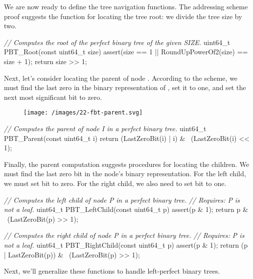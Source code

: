 \documentclass{article}
\begin{document}
We are now ready to define the tree navigation functions.
The addressing scheme proof suggests the function for locating the tree root: we divide the tree size by two.

\begin{code}[c]
\emph{// Computes the root of the perfect binary tree of the given SIZE.}
uint64_t PBT_Root(const uint64_t size) {
    assert(size == 1 || RoundUpPowerOf2(size) == size + 1);
    return size >> 1;
}
\end{code}

Next, let's consider locating the parent of node .
According to the scheme, we must find the last zero in the binary representation of , set it to one, and set the next most significant bit to zero.

\begin{figure}[grayscale-diagram,medium-size]
  \texttt{[image: /images/22-fbt-parent.svg]}
\end{figure}

\begin{code}[c]
\emph{// Computes the parent of node I in a perfect binary tree.}
uint64_t PBT_Parent(const uint64_t i) {
    return (LastZeroBit(i) | i) & ~(LastZeroBit(i) << 1);
}
\end{code}

Finally, the parent computation suggests procedures for locating the children.
We must find the last zero bit  in the node's binary representation.
For the left child, we must set bit  to zero.
For the right child, we also need to set bit  to one.

\begin{code}[c]
\emph{// Computes the left child of node P in a perfect binary tree.}
\emph{// Requires: P is not a leaf.}
uint64_t PBT_LeftChild(const uint64_t p) {
    assert(p & 1);
    return p & ~(LastZeroBit(p) >> 1);
}

\emph{// Computes the right child of node P in a perfect binary tree.}
\emph{// Requires: P is not a leaf.}
uint64_t PBT_RightChild(const uint64_t p) {
    assert(p & 1);
    return (p | LastZeroBit(p)) & ~(LastZeroBit(p) >> 1);
}
\end{code}

Next, we'll generalize these functions to handle left-perfect binary trees.
\end{document}
